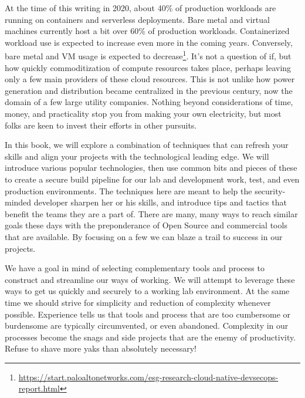 \justify
At the time of this writing in 2020, about 40\% of production workloads are running on containers and serverless deployments. Bare metal and virtual machines currently host a bit over 60\% of production workloads.
Containerized workload use is expected to increase even more in the coming years. Conversely, bare metal and VM usage is expected to decrease\footnote{\url{https://start.paloaltonetworks.com/esg-research-cloud-native-devsecops-report.html}}. It's not a question of if, but how quickly commoditization of compute resources takes place, perhaps leaving only a few main providers of these cloud resources. This is not unlike how power generation and
distribution became centralized in the previous century, now the domain of a few large utility companies. Nothing beyond considerations of time, money, and practicality stop you from making your own electricity, but
most folks are keen to invest their efforts in other pursuits.

\justify
In this book, we will explore a combination of techniques that can refresh your skills and align your projects with the technological leading edge. We will introduce various popular technologies, then use
common bits and pieces of these to create a secure build pipeline for our lab and development work, test, and even production environments. The techniques here are meant to help the security-minded developer
sharpen her or his skills, and introduce tips and tactics that benefit the teams they are a part of. There are many, many ways to reach similar goals these days with the preponderance of Open Source and commercial tools that are available. By focusing on a few we can blaze a trail to success in our projects.

\justify
We have a goal in mind of selecting complementary tools and process to construct and streamline our ways of working. We will attempt to leverage these ways to get us quickly and securely to a working lab
environment. At the same time we should strive for simplicity and reduction of complexity whenever possible. Experience tells us that tools and process that are too cumbersome or burdensome are typically
circumvented, or even abandoned. Complexity in our processes become the snags and side projects that are the enemy of productivity. Refuse to shave more yaks than absolutely necessary!
